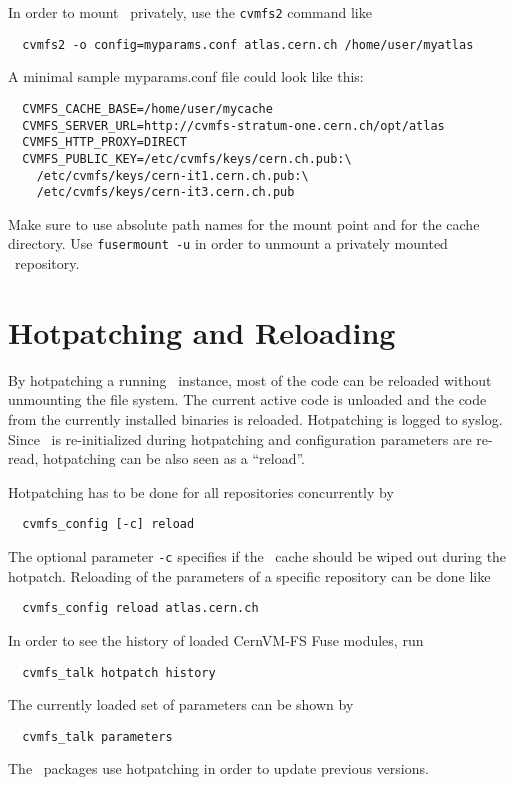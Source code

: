 In order to mount \cvmfs\ privately, use the \texttt{cvmfs2} command like
\begin{verbatim}
  cvmfs2 -o config=myparams.conf atlas.cern.ch /home/user/myatlas
\end{verbatim}
A minimal sample myparams.conf file could look like this:
\begin{verbatim}
  CVMFS_CACHE_BASE=/home/user/mycache
  CVMFS_SERVER_URL=http://cvmfs-stratum-one.cern.ch/opt/atlas
  CVMFS_HTTP_PROXY=DIRECT
  CVMFS_PUBLIC_KEY=/etc/cvmfs/keys/cern.ch.pub:\
    /etc/cvmfs/keys/cern-it1.cern.ch.pub:\
    /etc/cvmfs/keys/cern-it3.cern.ch.pub
\end{verbatim}

Make sure to use absolute path names for the mount point and for the cache directory.
Use \texttt{fusermount -u} in order to unmount a privately mounted \cvmfs\ repository.

\section{Hotpatching and Reloading}
\label{sct:hotpatch}

By hotpatching a running \cvmfs\ instance, most of the code can be reloaded without unmounting the file system.
The current active code is unloaded and the code from the currently installed binaries is reloaded.
Hotpatching is logged to syslog.
Since \cvmfs\ is re-initialized during hotpatching and configuration parameters are re-read, hotpatching can be also seen as a ``reload''.

Hotpatching has to be done for all repositories concurrently by
\begin{verbatim}
  cvmfs_config [-c] reload
\end{verbatim}
The optional parameter \texttt{-c} specifies if the \cvmfs\ cache should be wiped out during the hotpatch.
Reloading of the parameters of a specific repository can be done like
\begin{verbatim}
  cvmfs_config reload atlas.cern.ch
\end{verbatim}
In order to see the history of loaded CernVM-FS Fuse modules, run
\begin{verbatim}
  cvmfs_talk hotpatch history
\end{verbatim}
The currently loaded set of parameters can be shown by
\begin{verbatim}
  cvmfs_talk parameters
\end{verbatim}
The \cvmfs\ packages use hotpatching in order to update previous versions.


